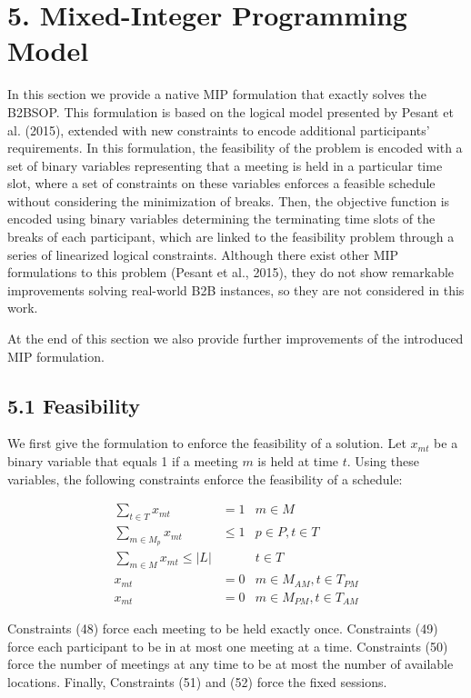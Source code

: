 \documentclass[10pt]{article}
\begin{document}
\section*{5. Mixed-Integer Programming Model}
In this section we provide a native MIP formulation that exactly solves the B2BSOP. This formulation is based on the logical model presented by Pesant et al. (2015), extended with new constraints to encode additional participants' requirements. In this formulation, the feasibility of the problem is encoded with a set of binary variables representing that a meeting is held in a particular time slot, where a set of constraints on these variables enforces a feasible schedule without considering the minimization of breaks. Then, the objective function is encoded using binary variables determining the terminating time slots of the breaks of each participant, which are linked to the feasibility problem through a series of linearized logical constraints. Although there exist other MIP formulations to this problem (Pesant et al., 2015), they do not show remarkable improvements solving real-world B2B instances, so they are not considered in this work.

At the end of this section we also provide further improvements of the introduced MIP formulation.

\subsection*{5.1 Feasibility}
We first give the formulation to enforce the feasibility of a solution. Let $x_{m t}$ be a binary variable that equals 1 if a meeting $m$ is held at time $t$. Using these variables, the following constraints enforce the feasibility of a schedule:

\[
\begin{array}{rlrl}
\sum_{t \in T} x_{m t} & =1 & m \in M \\
\sum_{m \in M_{p}} x_{m t} & \leq 1 & p \in P, t \in T \\
\sum_{m \in M} x_{m t} \leq|L| & & t \in T \\
x_{m t} & =0 & m \in M_{A M}, t \in T_{P M} \\
x_{m t} & =0 & m \in M_{P M}, t \in T_{A M} \tag{52}
\end{array}
\]

Constraints (48) force each meeting to be held exactly once. Constraints (49) force each participant to be in at most one meeting at a time. Constraints (50) force the number of meetings at any time to be at most the number of available locations. Finally, Constraints (51) and (52) force the fixed sessions.
\end{document}
